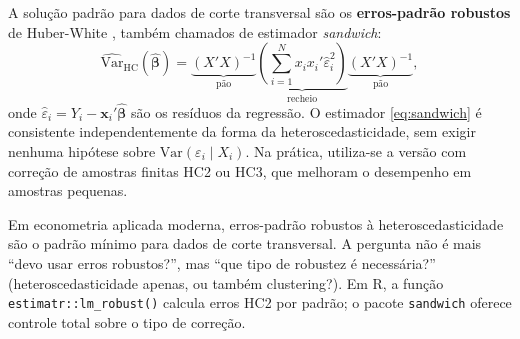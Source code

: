 A solução padrão para dados de corte transversal são os \textbf{erros-padrão robustos} de Huber-White \citep{Huber1967, White1980}, também chamados de estimador \textit{sandwich}:
\begin{equation}
  \widehat{\text{Var}}_{\text{HC}}(\hat{\boldsymbol{\beta}}) =
    \underbrace{(X'X)^{-1}}_{\text{pão}}
    \underbrace{\left(\sum_{i=1}^{N} x_i x_i' \hat{\varepsilon}_i^2\right)}_{\text{recheio}}
    \underbrace{(X'X)^{-1}}_{\text{pão}},
  \label{eq:sandwich}
\end{equation}
onde $\hat{\varepsilon}_i = Y_i - \boldsymbol{x}_i'\hat{\boldsymbol{\beta}}$ são os resíduos da regressão. O estimador \eqref{eq:sandwich} é consistente independentemente da forma da heteroscedasticidade, sem exigir nenhuma hipótese sobre $\text{Var}(\varepsilon_i \mid X_i)$. Na prática, utiliza-se a versão com correção de amostras finitas HC2 ou HC3, que melhoram o desempenho em amostras pequenas.

\begin{notabox}
Em econometria aplicada moderna, erros-padrão robustos à heteroscedasticidade são o padrão mínimo para dados de corte transversal. A pergunta não é mais ``devo usar erros robustos?'', mas ``que tipo de robustez é necessária?'' (heteroscedasticidade apenas, ou também clustering?). Em R, a função \texttt{estimatr::lm\_robust()} calcula erros HC2 por padrão; o pacote \texttt{sandwich} oferece controle total sobre o tipo de correção.
\end{notabox}

